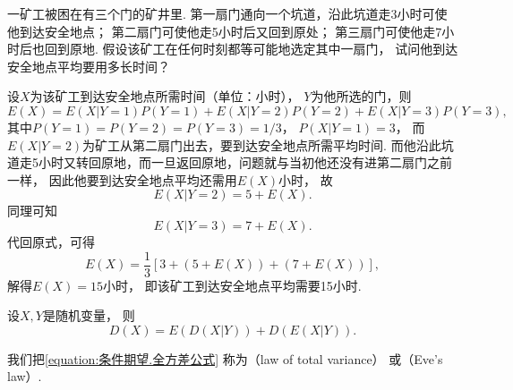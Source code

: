 \begin{example}
一矿工被困在有三个门的矿井里.
第一扇门通向一个坑道，沿此坑道走3小时可使他到达安全地点；
第二扇门可使他走5小时后又回到原处；
第三扇门可使他走7小时后也回到原地.
假设该矿工在任何时刻都等可能地选定其中一扇门，
试问他到达安全地点平均要用多长时间？
\begin{solution}
设\(X\)为该矿工到达安全地点所需时间（单位：小时），
\(Y\)为他所选的门，则\begin{equation*}
	E(X)
	= E(X \vert Y=1) P(Y=1)
	+ E(X \vert Y=2) P(Y=2)
	+ E(X \vert Y=3) P(Y=3),
\end{equation*}
其中\(P(Y=1) = P(Y=2) = P(Y=3) = 1/3\)，
\(P(X \vert Y=1) = 3\)，
而\(E(X \vert Y=2)\)为矿工从第二扇门出去，要到达安全地点所需平均时间.
而他沿此坑道走5小时又转回原地，而一旦返回原地，问题就与当初他还没有进第二扇门之前一样，
因此他要到达安全地点平均还需用\(E(X)\)小时，
故\begin{equation*}
	E(X \vert Y=2)
	= 5 + E(X).
\end{equation*}
同理可知\begin{equation*}
	E(X \vert Y=3)
	= 7 + E(X).
\end{equation*}
代回原式，可得\begin{equation*}
	E(X) = \frac13[ 3 + (5 + E(X)) + (7 + E(X)) ],
\end{equation*}
解得\(E(X) = 15\)小时，
即该矿工到达安全地点平均需要15小时.
\end{solution}
\end{example}

\begin{theorem}
设\(X,Y\)是随机变量，
则\begin{equation}\label{equation:条件期望.全方差公式}
	D(X)
	= E(D(X \vert Y))
	+ D(E(X \vert Y)).
\end{equation}
\end{theorem}

我们把\cref{equation:条件期望.全方差公式}
称为（law of total variance）
或（Eve's law）.
